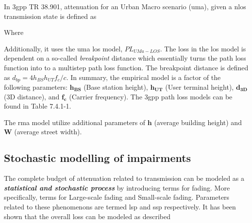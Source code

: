 In \gls{3gpp} TR 38.901, attenuation for an Urban Macro scenario (\gls{uma}), given a \gls{nlos} transmission state is defined as


Where


Additionally, it uses the \gls{uma} \gls{los} model, $PL_{UMa-LOS}$. The loss in the \gls{los} model is dependent on a so-called \emph{breakpoint} distance which essentially turns the path loss function into to a multistep path loss function. The breakpoint distance is defined as $d_{bp} = 4 h_{BS} h_{UT} f_c / c$. In summary, the empirical model is a factor of the following parameters: $\mathbf{h_{BS}}$ (Base station height), $\mathbf{h_{UT}}$ (User terminal height), $\mathbf{d_{3D}}$ ($3$D distance), and $\mathbf{f_c}$ (Carrier frequency). The \gls{3gpp} path loss models can be found in \cite{3GPP38901} Table 7.4.1-1. 

The \gls{rma} model utilize additional parameters of $\mathbf{h}$ (average building height) and $\mathbf{W}$ (average street width).


\subsection{Stochastic modelling of impairments}\label{sec:stochastic_channel_model}
The complete budget of attenuation related to transmission can be modeled as a \emph{\textbf{statistical and stochastic process}} by introducing terms for fading. More specifically, terms for Large-scale fading and Small-scale fading. Parameters related to these phenomenons are termed \gls{lsp} and \gls{ssp} respectively. It has been shown that the overall loss can be modeled as described

